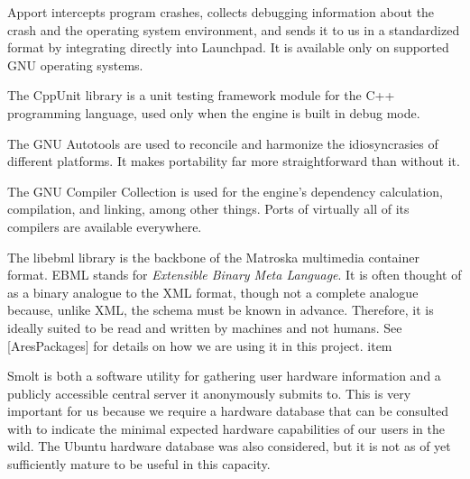 

\startitemize[4]

Apport intercepts program crashes, collects debugging information about the crash and the operating system environment, and sends it to us in a standardized format by integrating directly into Launchpad. It is available only on supported GNU operating systems.


The CppUnit library is a unit testing framework module for the C++ programming language, used only when the engine is built in debug mode.


The GNU Autotools are used to reconcile and harmonize the idiosyncrasies of different platforms. It makes portability far more straightforward than without it.


The GNU Compiler Collection is used for the engine's dependency calculation, compilation, and linking, among other things. Ports of virtually all of its compilers are available everywhere.


The libebml library is the backbone of the Matroska multimedia container format. EBML stands for {\it Extensible Binary Meta Language}. It is often thought of as a binary analogue to the XML format, though not a complete analogue because, unlike XML, the schema must be known in advance. Therefore, it is ideally suited to be read and written by machines and not humans. See [AresPackages] for details on how we are using it in this project.
item


Smolt is both a software utility for gathering user hardware information and a publicly accessible central server it anonymously submits to. This is very important for us because we require a hardware database that can be consulted with to indicate the minimal expected hardware capabilities of our users in the wild. The Ubuntu hardware database was also considered, but it is not as of yet sufficiently mature to be useful in this capacity.


